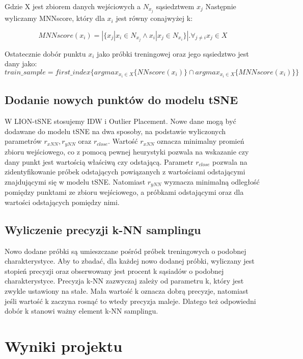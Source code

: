 \documentclass{article}
\begin{document}
Gdzie X jest zbiorem danych wejściowych a $ N_{x_{j}} $ sąsiedztwem $ x_j $
Następnie wyliczamy MNNscore, który dla $x_i$ jest równy conajwyżej k:

\[MNNscore(x_i) = | \{x_j | x_i \in N_{x_{j}} \land x_i | x_j \in N_{x_{i}} \} |. \forall_{j \neq i}x_j \in X \]

Ostatecznie dobór punktu $x_i$ jako próbki treningowej oraz jego sąsiedztwo jest dany jako: 
\[ train\_sample = first\_index\{argmax_{x_{i} \in X} \{ NNscore(x_i) \} \cap argmax_{x_{i} \in X} \{ MNNscore(x_i) \} \} \]

\subsection{Dodanie nowych punktów do modelu tSNE}

W LION-tSNE stosujemy IDW i Outlier Placement. 
Nowe dane mogą być dodawane do modelu tSNE na dwa sposoby, na podstawie 
wyliczonych parametrów $r_{xNN}, r_{yNN}$ oraz $r_{close}$. Wartość $r_{xNN}$ 
oznacza minimalny promień zbioru wejściowego, co z pomocą pewnej heurystyki 
pozwala na wskazanie czy dany punkt jest wartością właściwą czy odstającą.
Parametr $r_{close}$ pozwala na zidentyfikowanie próbek odstających powiązanych 
z wartościami odstającymi znajdującymi się w modelu tSNE.
Natomiast $r_{yNN}$ wyznacza minimalną odległość pomiędzy punktami ze zbioru wejściowego, 
a próbkami odstającymi oraz dla wartości odstających pomiędzy nimi.

\subsection{Wyliczenie precyzji k-NN samplingu}

Nowo dodane próbki są umieszczane pośród próbek treningowych o podobnej charakterystyce. 
Aby to zbadać, dla każdej nowo dodanej próbki, wyliczany jest stopień precyzji oraz obserwowany
jest procent k sąsiadów o podobnej charakterystyce. Precyzja k-NN zazwyczaj zależy od 
parametru k, który jest zwykle ustawiony na stałe. Mała wartość k oznacza dobrą precyzje, 
natomiast jeśli wartość k zaczyna rosnąć to wtedy precyzja maleje. Dlatego też odpowiedni dobór
k stanowi ważny element k-NN samplingu.

\section{Wyniki projektu}
\label{sec:results}
\end{document}
